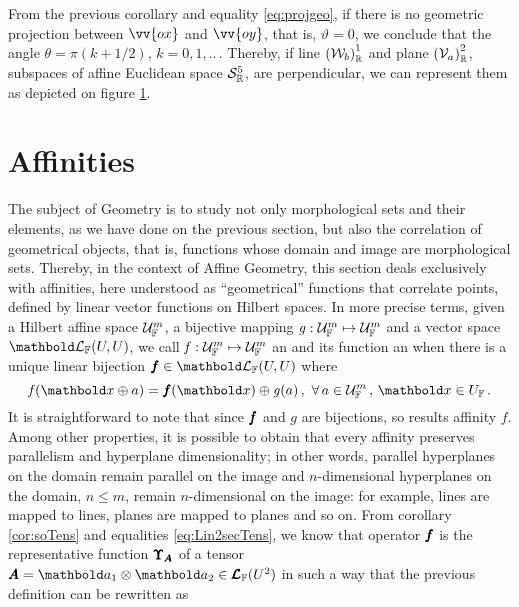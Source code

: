 From the previous corollary and equality \eqref{eq:projgeo}, if there is no geometric projection between $\vv{ox}$ and $\vv{oy}$, that is, $\vartheta=0$, we conclude that the angle $\theta=\pi(k+1/2)$, $k=0,1,..\,$. Thereby, if line $\eamsd{W}{\real}{b}{1}$ and plane $\eamsd{V}{\real}{a}{2}$, subspaces of affine Euclidean space $\eamd{S}{\real}{5}$, are perpendicular, we can represent them as depicted on figure \ref{fg:perpend}.
\begin{figure}[!ht]
	\centering
	\begin{center}
		\scalebox{.72}{}
	\end{center}
	\label{fg:perpend}
\end{figure}


\section{Affinities}
The subject of Geometry is to study not only morphological sets and their elements, as we have done on the previous section, but also the correlation of geometrical objects, that is, functions whose domain and image are morphological sets. Thereby, in the context of Affine Geometry, this section deals exclusively with affinities, here understood as ``geometrical'' functions that correlate points, defined by linear vector functions on Hilbert spaces. In more precise terms, given a Hilbert affine space $\eamd{U}{F}{m}$, a bijective mapping $\map{\mathit{g}}{\eamd{U}{F}{m}}{\eamd{U}{F}{m}}$ and a vector space $\evl{\cam{F}}{U}{U}$, we call  $\map{\mathit{f}}{\eamd{U}{F}{m}}{\eamd{U}{F}{m}}$ an  and its function an  when there is a unique linear bijection $\vtf{f}\in\evl{\cam{F}}{U}{U}$ where
\begin{equation}\label{eq:affty}
\fua{\mathit{f}}{\vto{x}\oplus a}=\fua{\vtf{f}}{\vto{x}}\oplus\fua{\mathit{g}}{a}\,,\,\,\forall\,a\in\eamd{U}{F}{m}\,,\,\vto{x}\in U_\cam{F}\,.
\end{equation}
It is straightforward to note that since $\vtf{f}$ and $\mathit{g}$ are bijections, so results affinity $\mathit{f}$. Among other properties, it is possible to obtain that every affinity preserves parallelism and hyperplane dimensionality; in other words, parallel hyperplanes on the  domain remain parallel on the image and $n$-dimensional hyperplanes on the domain, $n\leq m$, remain $n$-dimensional on the image: for example, lines are mapped to lines, planes are mapped to planes and so on. From corollary \ref{cor:soTens} and equalities \eqref{eq:Lin2secTens}, we know that operator $\vtf{f}$ is the representative function $\tnr{\Upsilon}_{\tnr{A}}$ of a tensor $\tnr{A}=\vto{a}_1\otimes\vto{a}_2\in\ete{\cam{F}}{U^2}$ in such a way that the previous definition can be rewritten as
